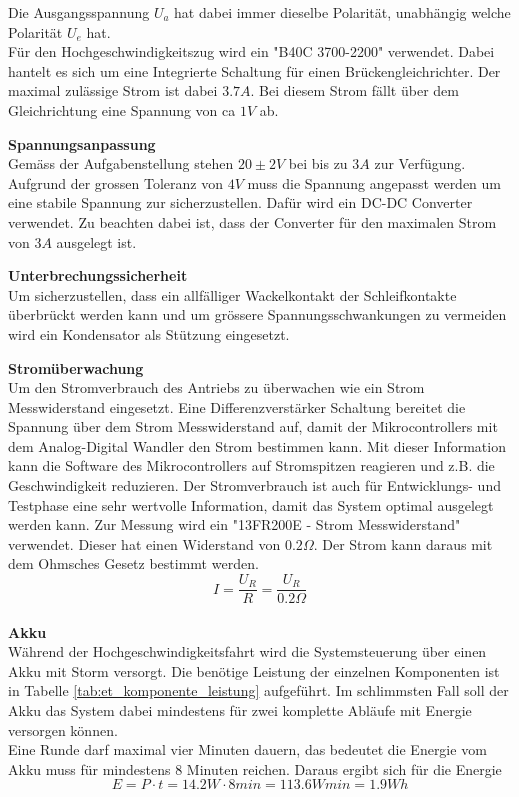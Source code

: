 \documentclass[../../main.tex]{subfiles}
\begin{document}
    Die Ausgangsspannung $U_a$ hat dabei immer dieselbe Polarität, unabhängig welche Polarität $U_e$ hat. \\
    Für den Hochgeschwindigkeitszug wird ein "B40C 3700-2200"  verwendet. Dabei hantelt es sich um eine Integrierte Schaltung für einen Brückengleichrichter. Der maximal zulässige Strom ist dabei $3.7A$. Bei diesem Strom fällt über dem Gleichrichtung eine Spannung von ca $1V$ ab.

    \textbf{Spannungsanpassung}\\
    Gemäss der Aufgabenstellung stehen $20\pm2V$ bei bis zu $3A$ zur Verfügung. Aufgrund der grossen Toleranz von $4V$ muss die Spannung angepasst werden um eine stabile Spannung zur sicherzustellen. Dafür wird ein DC-DC Converter verwendet. Zu beachten dabei ist, dass der Converter für den maximalen Strom von $3A$ ausgelegt ist.

    \textbf{Unterbrechungssicherheit}\\
    Um sicherzustellen, dass ein allfälliger Wackelkontakt der Schleifkontakte überbrückt werden kann und um grössere Spannungsschwankungen zu vermeiden wird ein Kondensator als Stützung eingesetzt.

    \textbf{Stromüberwachung}\\
    Um den Stromverbrauch des Antriebs zu überwachen wie ein Strom Messwiderstand eingesetzt. Eine
    Differenzverstärker Schaltung bereitet die Spannung über dem Strom Messwiderstand auf, damit der Mikrocontrollers mit
    dem Analog-Digital Wandler den Strom bestimmen kann. Mit dieser Information kann die Software des Mikrocontrollers
    auf Stromspitzen reagieren und z.B. die Geschwindigkeit reduzieren. Der Stromverbrauch ist auch für Entwicklungs-
    und Testphase eine sehr wertvolle Information, damit das System optimal ausgelegt werden kann.
    Zur Messung wird ein "13FR200E - Strom Messwiderstand" verwendet. Dieser hat einen Widerstand von $0.2\Omega$. Der Strom kann daraus mit dem Ohmsches Gesetz bestimmt werden. $$I=\frac{U_R}{R}=\frac{U_R}{0.2\Omega} $$
    \\
    \textbf{Akku}\\
    Während der Hochgeschwindigkeitsfahrt wird die Systemsteuerung über einen Akku mit Storm versorgt. Die benötige Leistung der einzelnen Komponenten ist in Tabelle \ref{tab:et_komponente_leistung} aufgeführt. Im schlimmsten Fall soll der Akku das System dabei mindestens für zwei komplette Abläufe mit Energie versorgen können.\\
    Eine Runde darf maximal vier Minuten dauern, das bedeutet die Energie vom Akku muss für mindestens 8 Minuten reichen. Daraus ergibt sich für die Energie $$E=P\cdot t = 14.2W \cdot 8min = 113.6Wmin = 1.9Wh$$
\end{document}
